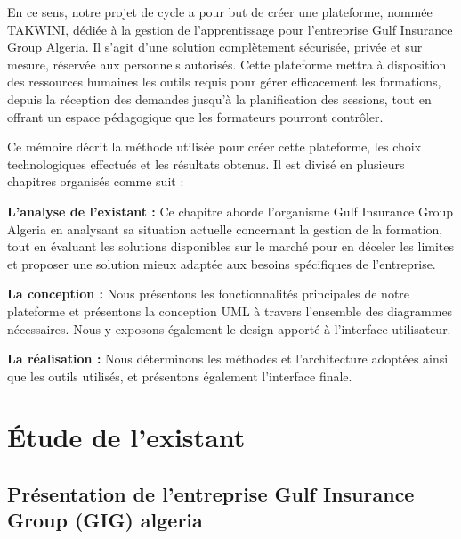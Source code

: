\documentclass{article}
\begin{document}
\begin{spacing}{1.3}
En ce sens, notre projet de cycle a pour but de créer une plateforme, nommée TAKWINI, dédiée à la gestion de l'apprentissage pour l'entreprise Gulf Insurance Group Algeria. Il s'agit d'une solution complètement sécurisée, privée et sur mesure, réservée aux personnels autorisés. Cette plateforme mettra à disposition des ressources humaines les outils requis pour gérer efficacement les formations, depuis la réception des demandes jusqu'à la planification des sessions, tout en offrant un espace pédagogique que les formateurs pourront contrôler.


\vspace{1cm}

Ce mémoire décrit la méthode utilisée pour créer cette plateforme, les choix technologiques effectués et les résultats obtenus. Il est divisé en plusieurs chapitres organisés comme suit :

\vspace{0,4cm}

\noindent \textbf{L’analyse de l’existant :} Ce chapitre aborde l'organisme Gulf Insurance Group Algeria en analysant sa situation actuelle concernant la gestion de la formation, tout en évaluant les solutions disponibles sur le marché pour en déceler les limites et proposer une solution mieux adaptée aux besoins spécifiques de l'entreprise.

\noindent \textbf{La conception :} Nous présentons les fonctionnalités principales de notre plateforme et présentons la conception UML à travers l’ensemble des diagrammes nécessaires. Nous y exposons également le design apporté à l’interface utilisateur.

\noindent \textbf{La réalisation :} Nous déterminons les méthodes et l’architecture adoptées ainsi que les outils utilisés, et présentons également l’interface finale.








\end{spacing}



\newpage

\section{Étude de l’existant}
\subsection{Présentation de l’entreprise Gulf Insurance Group (GIG) algeria}
\end{document}
